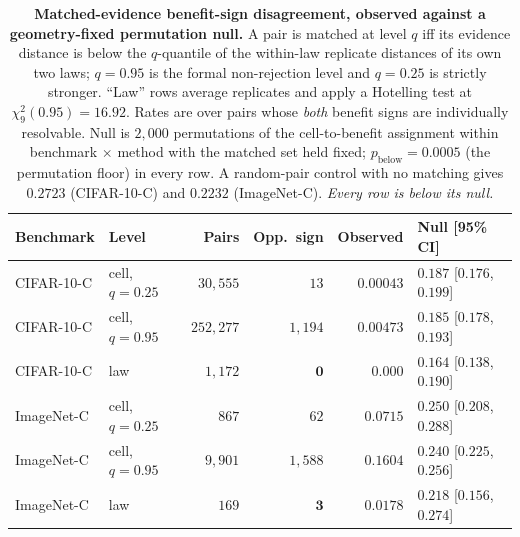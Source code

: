 \begin{table}[t]\centering\footnotesize
\caption{\textbf{Matched-evidence benefit-sign disagreement, observed against a geometry-fixed
permutation null.} A pair is matched at level $q$ iff its evidence distance is below the
$q$-quantile of the within-law replicate distances of its own two laws; $q{=}0.95$ is the formal
non-rejection level and $q{=}0.25$ is strictly stronger. ``Law'' rows average replicates and apply a
Hotelling test at $\chi^2_9(0.95)=16.92$. Rates are over pairs whose \emph{both} benefit signs are
individually resolvable. Null is $2{,}000$ permutations of the cell-to-benefit assignment within
benchmark $\times$ method with the matched set held fixed; $p_{\text{below}}=0.0005$ (the
permutation floor) in every row. A random-pair control with no matching gives $0.2723$
(CIFAR-10-C) and $0.2232$ (ImageNet-C). \emph{Every row is below its null.}}
\label{tab:necessity-rate}
\begin{tabular}{@{}llrrrl@{}}
\toprule
Benchmark & Level & Pairs & Opp.\ sign & Observed & Null [95\% CI] \\
\midrule
CIFAR-10-C & cell, $q{=}0.25$ & $30{,}555$ & $13$ & $0.00043$ & $0.187$ [$0.176$, $0.199$] \\
CIFAR-10-C & cell, $q{=}0.95$ & $252{,}277$ & $1{,}194$ & $0.00473$ & $0.185$ [$0.178$, $0.193$] \\
CIFAR-10-C & law             & $1{,}172$   & $\mathbf{0}$ & $0.000$ & $0.164$ [$0.138$, $0.190$] \\
\midrule
ImageNet-C & cell, $q{=}0.25$ & $867$   & $62$      & $0.0715$ & $0.250$ [$0.208$, $0.288$] \\
ImageNet-C & cell, $q{=}0.95$ & $9{,}901$ & $1{,}588$ & $0.1604$ & $0.240$ [$0.225$, $0.256$] \\
ImageNet-C & law              & $169$   & $\mathbf{3}$ & $0.0178$ & $0.218$ [$0.156$, $0.274$] \\
\bottomrule
\end{tabular}
\end{table}

